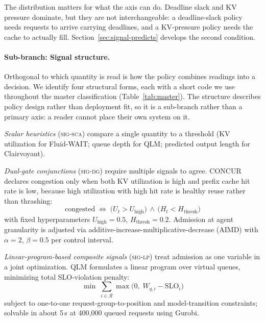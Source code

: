 The distribution matters for what the axis can do. Deadline slack and
KV pressure dominate, but they are not interchangeable: a deadline-slack
policy needs requests to arrive carrying deadlines, and a KV-pressure
policy needs the cache to actually fill. Section~\ref{sec:signal-predicts}
develops the second condition.

\paragraph{Sub-branch: Signal structure.} Orthogonal to which quantity
is read is how the policy combines readings into a decision. We identify
four structural forms, each with a short code we use throughout the
master classification (Table~\ref{tab:master}). The structure describes
policy design rather than deployment fit, so it is a sub-branch rather
than a primary axis: a reader cannot place their own system on it.

\textit{Scalar heuristics} (\textsc{sig-sca}) compare a single quantity
to a threshold (KV utilization for Fluid-WAIT; queue depth for QLM;
predicted output length for Clairvoyant).

\textit{Dual-gate conjunctions} (\textsc{sig-dg}) require multiple
signals to agree.
CONCUR declares congestion only when both KV utilization is high and
prefix cache hit rate is low, because high utilization with high hit
rate is healthy reuse rather than thrashing:
%
\begin{equation}
\text{congested} \;\iff\; \bigl(U_t > U_{\text{high}}\bigr) \,\wedge\, \bigl(H_t < H_{\text{thresh}}\bigr)
\label{eq:concur-dualgate}
\end{equation}
%
with fixed hyperparameters $U_{\text{high}} = 0.5$,
$H_{\text{thresh}} = 0.2$. Admission at agent granularity is adjusted
via additive-increase-multiplicative-decrease (AIMD) with $\alpha = 2$,
$\beta = 0.5$ per control interval.

\textit{Linear-program-based composite signals} (\textsc{sig-lp}) treat
admission as one variable in a joint optimization. QLM formulates a linear program over
virtual queues, minimizing total SLO-violation penalty:
%
\begin{equation}
\min \; \sum_{i \in \mathcal{R}} \max\bigl(0,\; W_{q,i} - \mathrm{SLO}_i\bigr)
\label{eq:qlm-lp}
\end{equation}
%
subject to one-to-one request-group-to-position and model-transition
constraints; solvable in about 5\,s at 400{,}000 queued requests using
Gurobi.

